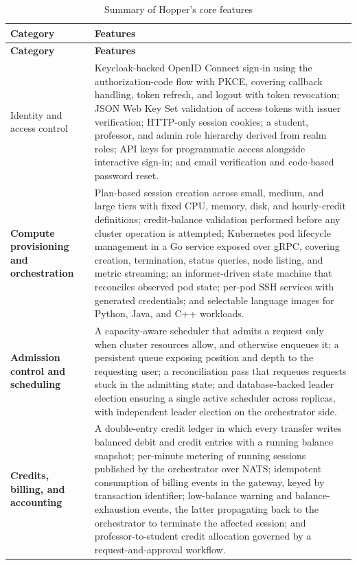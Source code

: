 \documentclass[12pt,a4paper]{article}
\begin{document}
\begin{longtable}{
    >{\raggedright\arraybackslash\bfseries}p{}
    >{\raggedright\arraybackslash}p{}
}
\caption{Summary of Hopper's core features}
\label{tab:core-features}\\

\toprule
\textbf{Category} & \textbf{Features} \\
\midrule
\endfirsthead

\toprule
\textbf{Category} & \textbf{Features} \\
\midrule
\endhead

\bottomrule
\endfoot

Identity and access control &
Keycloak-backed OpenID Connect sign-in using the authorization-code flow with
PKCE, covering callback handling, token refresh, and logout with token
revocation; JSON Web Key Set validation of access tokens with issuer
verification; HTTP-only session cookies; a student, professor, and admin role
hierarchy derived from realm roles; API keys for programmatic access alongside
interactive sign-in; and email verification and code-based password reset. \\

Compute provisioning and orchestration &
Plan-based session creation across small, medium, and large tiers with fixed CPU,
memory, disk, and hourly-credit definitions; credit-balance validation performed
before any cluster operation is attempted; Kubernetes pod lifecycle management in
a Go service exposed over gRPC, covering creation, termination, status queries,
node listing, and metric streaming; an informer-driven state machine that
reconciles observed pod state; per-pod SSH services with generated credentials;
and selectable language images for Python, Java, and C++ workloads. \\

Admission control and scheduling &
A capacity-aware scheduler that admits a request only when cluster resources
allow, and otherwise enqueues it; a persistent queue exposing position and depth
to the requesting user; a reconciliation pass that requeues requests stuck in the
admitting state; and database-backed leader election ensuring a single active
scheduler across replicas, with independent leader election on the orchestrator
side. \\

Credits, billing, and accounting &
A double-entry credit ledger in which every transfer writes balanced debit and
credit entries with a running balance snapshot; per-minute metering of running
sessions published by the orchestrator over NATS; idempotent consumption of
billing events in the gateway, keyed by transaction identifier; low-balance
warning and balance-exhaustion events, the latter propagating back to the
orchestrator to terminate the affected session; and professor-to-student credit
allocation governed by a request-and-approval workflow. \\


\end{longtable}
\end{document}
